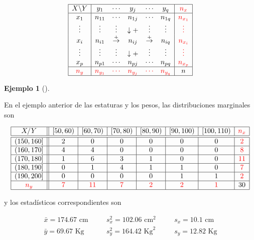 \documentclass[
  a4paper,
]{scrreport}
\theoremstyle{plain}
\theoremstyle{definition}
\newtheorem{example}{Ejemplo}[chapter]
\theoremstyle{definition}
\theoremstyle{remark}
\begin{document}
\[
\begin{array}{|c|ccccc|c|}
\hline
X\backslash Y & y_1 & \cdots & y_j & \cdots & y_q & \color{red}{n_x}\\
\hline
x_1 & n_{11} & \cdots & n_{1j} & \cdots & n_{1q} & \color{red}{n_{x_1}}\\
\vdots & \vdots & \vdots & \downarrow + & \vdots & \vdots & \color{red}{\vdots} \\
x_i & n_{i1} & \stackrel{+}{\rightarrow} & n_{ij} & \stackrel{+}{\rightarrow} & n_{iq} & \color{red}{n_{x_i}}\\
\vdots & \vdots & \vdots & \downarrow +  & \vdots & \vdots & \color{red}{\vdots}\\
x_p & n_{p1} & \cdots & n_{pj} & \cdots & n_{pq} & \color{red}{n_{x_p}} \\
\hline
\color{red}{n_y} & \color{red}{n_{y_1}} & \color{red}{\cdots} & \color{red}{n_{y_j}} & \color{red}{\cdots} & \color{red}{n_{y_q}} & n\\
\hline
\end{array}
\]

\begin{example}[]\protect\hypertarget{exm-distribuciones-marginales}{}\label{exm-distribuciones-marginales}

En el ejemplo anterior de las estaturas y los pesos, las distribuciones
marginales son

\[
\begin{array}{|c||c|c|c|c|c|c|c|}
\hline
  X/Y & [50,60) & [60,70) & [70,80) & [80,90) & [90,100) & [100,110) & \color{red}{n_x}\\
  \hline\hline
  (150,160] & 2 & 0 & 0 & 0 & 0 & 0 & \color{red}{2}\\
  \hline
  (160,170] & 4 & 4 & 0 & 0 & 0 & 0 & \color{red}{8}\\
  \hline
  (170,180] & 1 & 6 & 3 & 1 & 0 & 0 & \color{red}{11} \\
  \hline
  (180,190] & 0 & 1 & 4 & 1 & 1 & 0 & \color{red}{7} \\
  \hline
  (190,200] & 0 & 0 & 0 & 0 & 1 & 1 & \color{red}{2}\\
  \hline
  \color{red}{n_y} & \color{red}{7} & \color{red}{11} & \color{red}{7} & \color{red}{2} & \color{red}{2} & \color{red}{1} & 30\\
  \hline
\end{array}
\]

y los estadísticos correspondientes son

\[
\begin{array}{lllll}
\bar x = 174.67 \mbox{ cm} & \quad & s^2_x = 102.06 \mbox{ cm}^2 & \quad & s_x = 10.1 \mbox{ cm}\\
\bar y = 69.67 \mbox{ Kg} & & s^2_y = 164.42 \mbox{ Kg}^2 & & s_y = 12.82 \mbox{ Kg}
\end{array}
\]

\end{example}
\end{document}
